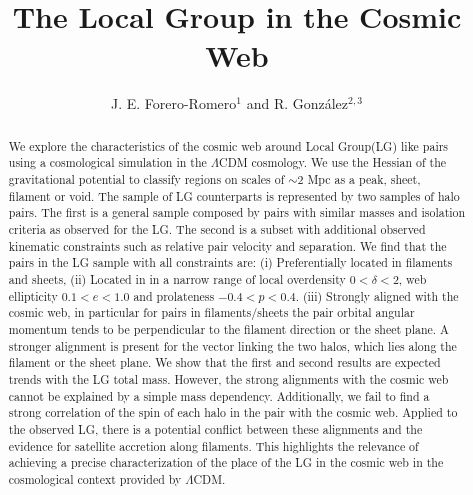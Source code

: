 \documentclass{emulateapj}
\begin{document}

\title{The Local Group in the Cosmic Web}
\author{J. E. Forero-Romero$^1$ and R. Gonz\'alez$^{2,3}$}


\begin{abstract}
We explore the characteristics of the
cosmic web around Local Group(LG) like pairs  using a cosmological simulation in the
$\Lambda$CDM cosmology.  
We use the Hessian of the gravitational potential to classify regions
on scales of $\sim 2$ Mpc as a peak, sheet, filament or void.  
The sample of LG counterparts is represented by two samples of halo
pairs. 
The first is a general sample composed by pairs with
similar masses and isolation criteria as observed for the LG.  
The second is a subset with additional observed kinematic constraints 
such as relative pair velocity and separation. 
We find that the pairs in the LG sample with all constraints are: (i)
Preferentially   located in filaments and sheets, (ii) Located in in a
narrow range of local overdensity $0<\delta<2$, web ellipticity $0.1<e<1.0$ and
prolateness $-0.4<p<0.4$.  (iii) Strongly aligned with the cosmic web,
in particular for pairs in filaments/sheets the pair orbital angular
momentum tends to be perpendicular to the filament direction or the
sheet plane.
A stronger alignment is present for the vector linking the two halos,
which lies along the filament or the sheet plane.  
We show that the first and second results are expected trends with the LG
total mass. 
However, the strong alignments with the cosmic web cannot be explained
by a simple mass dependency. 
Additionally, we fail to find a strong correlation of the spin of each
halo in the pair with the cosmic web.
Applied to the observed LG, there is a potential conflict between
these alignments and the evidence for satellite accretion along
filaments. 
This highlights the relevance of achieving a precise characterization
of the place of the LG in the cosmic web in the cosmological context
provided by $\Lambda$CDM.


\end{abstract}
\end{document}
